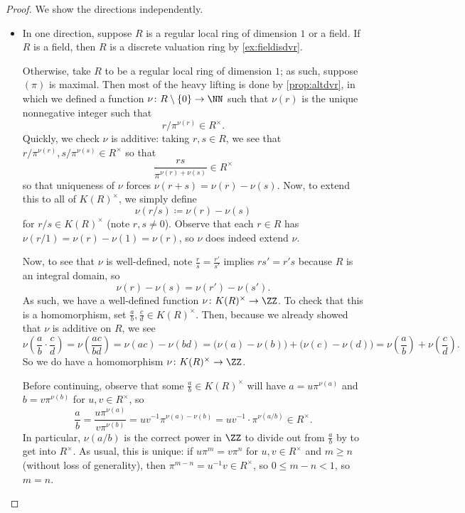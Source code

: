 \begin{proof}
	We show the directions independently.
	\begin{itemize}
		\item In one direction, suppose $R$ is a regular local ring of dimension $1$ or a field. If $R$ is a field, then $R$ is a discrete valuation ring by \autoref{ex:fieldisdvr}.

		Otherwise, take $R$ to be a regular local ring of dimension $1$; as such, suppose $(\pi)$ is maximal. Then most of the heavy lifting is done by \autoref{prop:altdvr}, in which we defined a function $\nu\colon R\setminus\{0\}\to\NN$ such that $\nu(r)$ is the unique nonnegative integer such that
		\[r/\pi^{\nu(r)}\in R^\times.\]
		Quickly, we check $\nu$ is additive: taking $r,s\in R$, we see that $r/\pi^{\nu(r)},s/\pi^{\nu(s)}\in R^\times$ so that
		\[\frac{rs}{\pi^{\nu(r)+\nu(s)}}\in R^\times\]
		so that uniqueness of $\nu$ forces $\nu(r+s)=\nu(r)-\nu(s)$. Now, to extend this to all of $K(R)^\times$, we simply define
		\[\nu(r/s)\coloneqq\nu(r)-\nu(s)\]
		for $r/s\in K(R)^\times$ (note $r,s\ne0$). Observe that each $r\in R$ has $\nu(r/1)=\nu(r)-\nu(1)=\nu(r)$, so $\nu$ does indeed extend $\nu$.
		
		Now, to see that $\nu$ is well-defined, note $\frac rs=\frac{r'}{s'}$ implies $rs'=r's$ because $R$ is an integral domain, so
		\[\nu(r)-\nu(s)=\nu(r')-\nu(s').\]
		As such, we have a well-defined function $\nu\colon K(R)^\times\to\ZZ$. To check that this is a homomorphism, set $\frac ab,\frac cd\in K(R)^\times$. Then, because we already showed that $\nu$ is additive on $R$, we see
		\[\nu\left(\frac ab\cdot\frac cd\right)=\nu\left(\frac{ac}{bd}\right)=\nu(ac)-\nu(bd)=\big(\nu(a)-\nu(b)\big)+\big(\nu(c)-\nu(d)\big)=\nu\left(\frac ab\right)+\nu\left(\frac cd\right).\]
		So we do have a homomorphism $\nu\colon K(R)^\times\to\ZZ$.
		
		Before continuing, observe that some $\frac ab\in K(R)^\times$ will have $a=u\pi^{\nu(a)}$ and $b=v\pi^{\nu(b)}$ for $u,v\in R^\times$, so
		\[\frac ab=\frac{u\pi^{\nu(a)}}{v\pi^{\nu(b)}}=uv^{-1}\pi^{\nu(a)-\nu(b)}=uv^{-1}\cdot\pi^{\nu(a/b)}\in R^\times.\]
		In particular, $\nu(a/b)$ is the correct power in $\ZZ$ to divide out from $\frac ab$ by to get into $R^\times$. As usual, this is unique: if $u\pi^m=v\pi^n$ for $u,v\in R^\times$ and $m\ge n$ (without loss of generality), then $\pi^{m-n}=u^{-1}v\in R^\times$, so $0\le m-n<1$, so $m=n$.


\end{itemize}
\end{proof}
